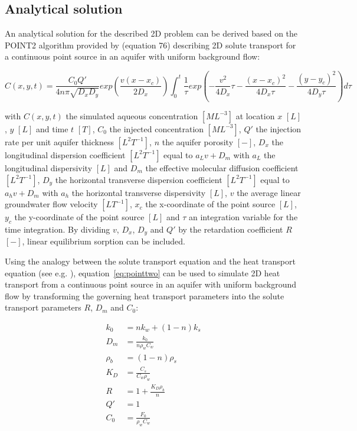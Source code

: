 

\subsection{Analytical solution}

An analytical solution for the described 2D problem can be derived based on the POINT2 algorithm provided by \cite{wexler1992} (equation 76) describing 2D solute transport for a continuous point source in an aquifer with uniform background flow:

\begin{equation}
    C(x,y,t) = \frac{C_0Q'}{4n\pi\sqrt{D_xD_y}}exp(\frac{v(x-x_c)}{2D_x})\int_0^t\frac{1}{\tau} exp(-\frac{v^2}{4D_x}\tau - \frac{(x-x_c)^2}{4D_x\tau}-\frac{(y-y_c)^2}{4D_y\tau})d\tau
    \label{eq:pointtwo}
\end{equation}

with $C(x,y,t)$ the simulated aqueous concentration $[ML^{-3}]$ at location $x$ $[L]$, $y$ $[L]$ and time $t$ $[T]$, $C_0$ the injected concentration $[ML^{-3}]$, $Q'$ the injection rate per unit aquifer thickness $[L^2T^{-1}]$, $n$ the aquifer porosity $[-]$, $D_x$ the longitudinal dispersion coefficient $[L^2T^{-1}]$ equal to $a_Lv + D_m$ with $a_L$ the longitudinal dispersivity $[L]$ and $D_m$ the effective molecular diffusion coefficient $[L^2T^{-1}]$, $D_y$ the horizontal transverse dispersion coefficient $[L^2T^{-1}]$ equal to $a_hv + D_m$ with $a_h$ the horizontal transverse dispersivity $[L]$, $v$ the average linear groundwater flow velocity $[LT^{-1}]$, $x_c$ the x-coordinate of the point source $[L]$, $y_c$ the y-coordinate of the point source $[L]$ and $\tau$ an integration variable for the time integration. By dividing $v$, $D_x$, $D_y$ and $Q'$ by the retardation coefficient $R$ $[-]$, linear equilibrium sorption can be included.

Using the analogy between the solute transport equation and the heat transport equation (see e.g. \cite{zheng2010mt3dmsv5.3}), equation~\ref{eq:pointtwo} can be used to simulate 2D heat transport from a continuous point source in an aquifer with uniform background flow by transforming the governing heat transport parameters into the solute transport parameters $R$, $D_m$ and $C_0$:

\begin{align}
    k_0 &= n k_w + (1 - n) k_s \\
    D_m &= \frac{k_0}{n  \rho_w  C_w} \\
    \rho_b &= (1 - n) \rho_s \\
    K_D &= \frac{C_s}{C_w \rho_w} \\
    R &= 1 + \frac{K_D \rho_b}{n} \\
    Q' &= 1 \\
    C_0 &= \frac{F_0}{\rho_w C_w} \\
\end{align}

